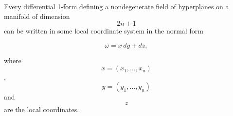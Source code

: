 Every differential 1-form defining a nondegenerate field of hyperplanes on a manifold of dimension $$2n + 1$$ can be written in some local coordinate system in the normal form

$$\omega = x\,dy + dz,$$

where $$x = (x_1, \ldots, x_n)$$, $$y = (y_1, \ldots, y_n)$$ and $$z$$ are the local coordinates.

